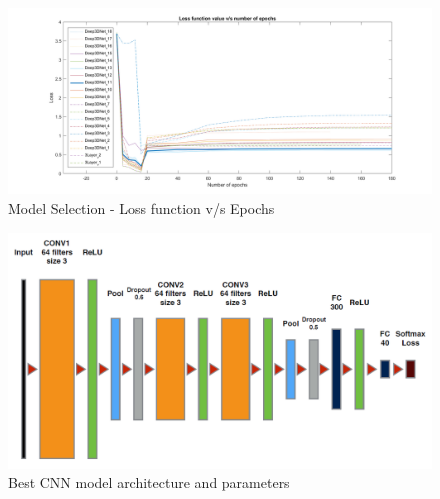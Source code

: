 \documentclass[10pt,twocolumn,letterpaper]{article}
\begin{document}
\begin{figure}
\begin{center}
\includegraphics[width=\linewidth]{Model_Selection_Loss.png}
\end{center}
   \caption{Model Selection - Loss function v/s Epochs}
\label{model_loss}
\end{figure}

\begin{figure}[t] 
\begin{center}
	\includegraphics[width=\linewidth]{Best_model_arch.png}
\end{center}
   \caption{Best CNN model architecture and parameters}
\label{best_model}
\end{figure}
\end{document}
